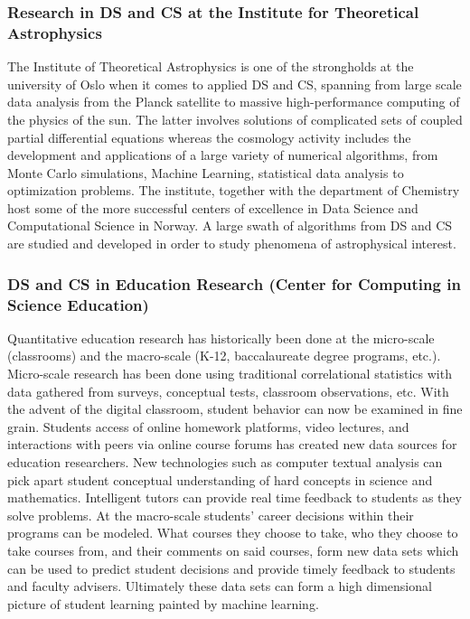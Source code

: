 \documentclass[a4paper,10pt]{article}
\begin{document}
\subsubsection*{Research in DS and CS at the Institute for Theoretical Astrophysics}
The Institute of Theoretical Astrophysics is one of the strongholds at the university of Oslo when it comes to applied DS and CS, spanning from large scale data analysis from the Planck satellite to massive high-performance computing of the physics of the sun. The latter involves solutions of complicated sets of coupled partial differential equations whereas the cosmology activity includes  the development and applications of a large variety of numerical algorithms, from   Monte Carlo simulations, Machine Learning, statistical data analysis to optimization problems. The institute, together with the department of Chemistry host some of the more successful centers of excellence in Data Science and Computational Science in Norway. A large swath of algorithms from DS and CS are studied and developed in order to study phenomena of astrophysical interest. 
\subsubsection*{DS and CS in Education Research (Center for Computing in Science Education)}


Quantitative education research has historically been done at the micro-scale (classrooms) and the macro-scale (K-12, baccalaureate degree programs, etc.). Micro-scale research has been done using traditional correlational statistics with data gathered from surveys, conceptual tests, classroom observations, etc. With the advent of the digital classroom, student behavior can now be examined in fine grain. Students access of online homework platforms, video lectures, and interactions with peers via online course forums has created new data sources for education researchers. New technologies such as computer textual analysis can pick apart student conceptual understanding of hard concepts in science and mathematics. Intelligent tutors can provide real time feedback to students as they solve problems. At the macro-scale students’ career decisions within their programs can be modeled. What courses they choose to take, who they choose to take courses from, and their comments on said courses, form new data sets which can be used to predict student decisions and provide timely feedback to students and faculty advisers. Ultimately these data sets can form a high dimensional picture of student learning painted by machine learning.
\end{document}

